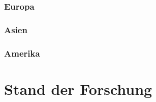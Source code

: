 \subsubsection{Europa}

\blindtext 

\blindtext

\blindtext

\subsubsection{Asien}

\blindtext 

\blindtext

\blindtext

\subsubsection{Amerika}

\blindtext 

\blindtext

\blindtext


\section{Stand der Forschung}

\blindtext 

\blindtext

\blindtext